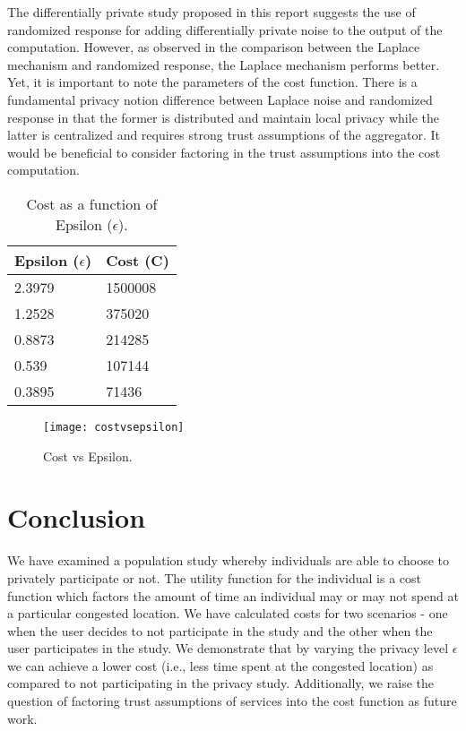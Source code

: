 \documentclass[conference]{IEEEtran}
\begin{document}
The differentially private study proposed in this report suggests the use of randomized response for adding differentially private noise to the output of the computation. However, as observed in the comparison between the Laplace mechanism and randomized response, the Laplace mechanism performs better. Yet, it is important to note the parameters of the cost function. There is a fundamental privacy notion difference between Laplace noise and randomized response in that the former is distributed and maintain local privacy while the latter is centralized and requires strong trust assumptions of the aggregator. It would be beneficial to consider factoring in the trust assumptions into the cost computation.


\begin{table}[]
\small
\centering
\begin{tabular}{l|l}
\textbf{Epsilon ($\epsilon$)} & \textbf{Cost (C)} \\
\hline
2.3979               & 1500008           \\ \hline
1.2528               & 375020            \\ \hline
0.8873               & 214285            \\ \hline
0.539                & 107144            \\ \hline
0.3895               & 71436            
\end{tabular}
\caption{Cost as a function of Epsilon ($\epsilon$).}
\label{tab:costepsilon}
\end{table}



\begin{figure}[t!]
\centering
\texttt{[image: costvsepsilon]}
\caption{Cost vs Epsilon.}
\label{fig:costvsepsilon}
\end{figure}
 \section{Conclusion}

We have examined a population study whereby individuals are able to choose to privately participate or not. The utility function for the individual is a cost function which factors the amount of time an individual may or may not spend at a particular congested location. We have calculated costs for two scenarios - one when the user decides to not participate in the study and the other when the user participates in the study. We demonstrate that by varying the privacy level $\epsilon$ we can achieve a lower cost (i.e., less time spent at the congested location) as compared to not participating in the privacy study. Additionally, we raise the question of factoring trust assumptions of services into the cost function as future work.
 


\end{document}
